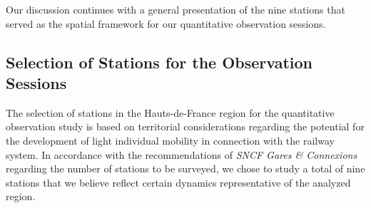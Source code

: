 \begin{refsegment}
Our discussion continues with a general presentation of the nine stations that served as the spatial framework for our quantitative observation sessions.%

\subsection{Selection of Stations for the Observation Sessions
    \label{chap3:observation-quantitative-gares-examinees}
    }

The selection of stations in the Hauts-de-France region for the quantitative observation study is based on territorial considerations regarding the potential for the development of light individual mobility in connection with the railway system. In accordance with the recommendations of \textsl{SNCF Gares \& Connexions} regarding the number of stations to be surveyed, we chose to study a total of nine stations that we believe reflect certain dynamics representative of the analyzed region.%


\end{refsegment}
